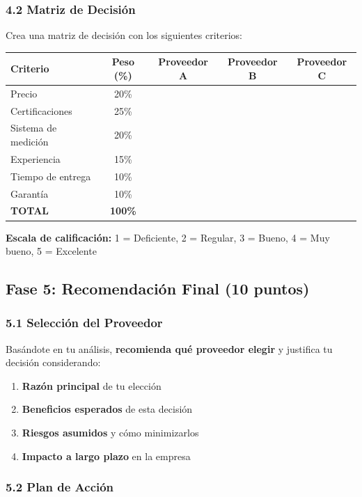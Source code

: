 \documentclass{article}
\begin{document}
\subsubsection*{4.2 Matriz de Decisión}

Crea una matriz de decisión con los siguientes criterios:

\begin{tabular}{|l|c|c|c|c|}
\hline
\textbf{Criterio} & \textbf{Peso (\%)} & \textbf{Proveedor A} & \textbf{Proveedor B} & \textbf{Proveedor C} \\
\hline
Precio & 20\% & & & \\
Certificaciones & 25\% & & & \\
Sistema de medición & 20\% & & & \\
Experiencia & 15\% & & & \\
Tiempo de entrega & 10\% & & & \\
Garantía & 10\% & & & \\
\hline
\textbf{TOTAL} & \textbf{100\%} & & & \\
\hline
\end{tabular}

\textbf{Escala de calificación:} 1 = Deficiente, 2 = Regular, 3 = Bueno, 4 = Muy bueno, 5 = Excelente

\subsection*{Fase 5: Recomendación Final (10 puntos)}

\subsubsection*{5.1 Selección del Proveedor}

Basándote en tu análisis, \textbf{recomienda qué proveedor elegir} y justifica tu decisión considerando:
\begin{enumerate}
    \item \textbf{Razón principal} de tu elección
    \item \textbf{Beneficios esperados} de esta decisión
    \item \textbf{Riesgos asumidos} y cómo minimizarlos
    \item \textbf{Impacto a largo plazo} en la empresa
\end{enumerate}

\subsubsection*{5.2 Plan de Acción}
\end{document}
